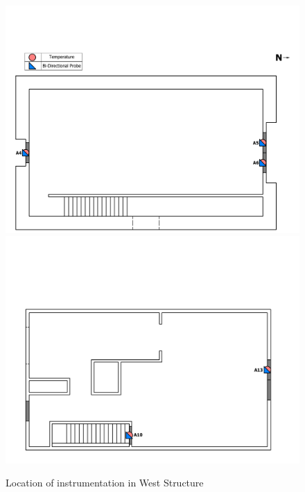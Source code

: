 \documentclass[12pt,oneside]{book}
\begin{document}
\begin{figure}[!ht]
\includegraphics[trim=0cm 0cm 0.75cm 4.5cm, clip=true, width=6in]{../Drawings/Instrumentation/West_Test_Structure_Devices_Hose_Test_1st_Floor}
\\
\includegraphics[trim=0cm 0cm 0.75cm 5.0cm, clip=true, width=6in]{../Drawings/Instrumentation/West_Test_Structure_Devices_Hose_Test_2nd_Floor}
\caption[Location of Instrumentation in West Structure]{Location of instrumentation in West Structure}
\label{fig:west_instrumentation}
\end{figure}

\clearpage
\end{document}
